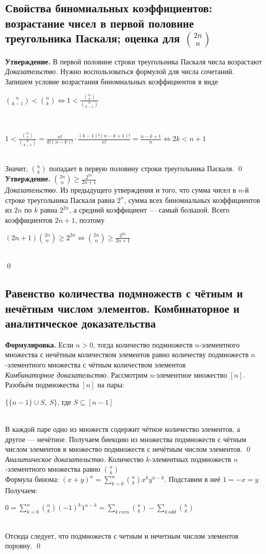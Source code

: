 \documentclass[a4paper]{article}
\begin{document}
\subsection{Свойства биномиальных коэффициентов: возрастание чисел в первой половине треугольника Паскаля; оценка для $\binom{2n}{n}$}
\textbf{Утверждение.} В первой половине строки треугольника Паскаля числа возрастают\\[2mm]
\textit{Доказательство.} Нужно воспользоваться формулой для числа сочетаний. Запишем условие возрастания биномиальных коэффициентов в виде\\[2mm]
\centerline{$\binom{n}{k-1}<\binom{n}{k}\Leftrightarrow1<\frac{\binom{n}{k}}{\binom{n}{k-1}}$}\\[2mm]
\centerline{$1<\frac{\binom{n}{k}}{\binom{n}{k-1}}=\frac{n!}{k!(n-k)!}\cdot\frac{(k-1)!(n-k+1)!}{n!}=\frac{n-k+1}{n}\Leftrightarrow2k<n+1$}\\[2mm]
Значит, $\binom{n}{k}$ попадает в первую половину строки треугольника Паскаля. \qed\\[2mm]
\textbf{Утверждение.} $\binom{2n}{n}\geqslant\frac{2^{2n}}{2n+1}$\\[2mm]
\textit{Доказательство.} Из предыдущего утверждения и того, что сумма чисел в $n$-й строке треугольника Паскаля равна $2^n$, сумма всех биномиальных коэффициентов из $2n$ по $k$ равна $2^{2n}$, а средний коэффициент — самый большой. Всего коэффициентов $2n+1$, поэтому\\[2mm]
\centerline{$(2n+1)\binom{2n}{n}\geqslant2^{2n}\Leftrightarrow\binom{2n}{n}\geqslant\frac{2^{2n}}{2n+1}$}\\[2mm]
\qed
\subsection{Равенство количества подмножеств с чётным и нечётным числом элементов. Комбинаторное и аналитическое доказательства}
\textbf{Формулировка.} Если $n>0$, тогда количество подмножеств $n$-элементного множества с нечётным количеством элементов равно количеству подмножеств $n$-элементного множества с чётным количеством элементов\\[2mm]
\textit{Комбинаторное доказательство.} Рассмотрим $n$-элементное множество $[n]$. Разобьём подмножества $[n]$ на пары:\\[2mm]
\centerline{$\{\{n-1\}\cup S,\ S\}$, где $S\subseteq[n-1]$}\\[2mm]
 В каждой паре одно из множеств содержит чётное количество элементов, а другое — нечётное. Получаем биекцию из множества подмножеств с чётным числом элементов в множество подмножеств с нечётным числом элементов. \qed\\[2mm]
\textit{Аналитическое доказательство.} Количество $k$-элементных подмножеств $n$-элементного множества равно $\binom{n}{k}$\\[2mm]
Формула бинома: $(x+y)^n=\sum\limits_{k=0}^n \binom{n}{k}x^ky^{n-k}$. Подставим в неё $1=-x=y$\\[2mm]
Получаем:\\[2mm]
\centerline{$0=\sum\limits_{k=0}^n\binom{n}{k}(-1)^k1^{n-k}=\sum\limits_{k\ {even}}\binom{n}{k}-\sum\limits_{k\ {odd}} \binom{n}{k}$}\\[2mm]
Отсюда следует, что подмножеств с четным и нечетным числом элементов поровну. \qed
\end{document}
